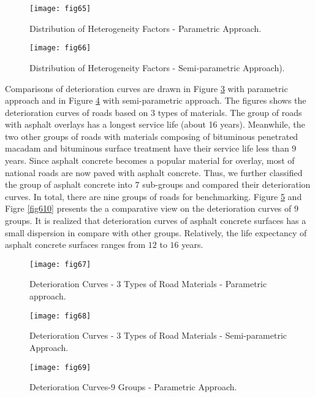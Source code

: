 \begin{figure}[t]
\begin{center}
\texttt{[image: fig65]}
\end{center}
\caption{Distribution of Heterogeneity Factors - Parametric Approach.}
\label{fig65}
\end{figure}

\begin{figure}[t]
\begin{center}
\texttt{[image: fig66]}
\end{center}
\caption{Distribution of Heterogeneity Factors - Semi-parametric Approach).}
\label{fig66}
\end{figure}

Comparisons of deterioration curves are drawn in Figure \ref{fig67} with parametric approach and in Figure \ref{fig68} with semi-parametric approach. The figures shows the deterioration curves of roads based on $3$ types of materials. The group of roads with asphalt overlays has a longest service life (about 16 years). Meanwhile, the two other groups of roads with materials composing of bituminous penetrated macadam and bituminous surface treatment have their service life less than $9$ years. Since asphalt concrete becomes a popular material for overlay, most of national roads are now paved with asphalt concrete. Thus, we further classified the group of asphalt concrete into $7$ sub-groups and compared their deterioration curves. In total, there are nine groups of roads for benchmarking. Figure \ref{fig69} and Figre \ref{fig610} presents the a comparative view on the deterioration curves of $9$ groups. It is realized that deterioration curves of asphalt concrete surfaces has a small dispersion in compare with other groups. Relatively, the life expectancy of asphalt concrete surfaces ranges from $12$ to $16$ years.

\begin{figure}[t]
\begin{center}
\texttt{[image: fig67]}
\end{center}
\caption{Deterioration Curves - 3 Types of Road Materials - Parametric approach.}
\label{fig67}
\end{figure}

\begin{figure}[t]
\begin{center}
\texttt{[image: fig68]}
\end{center}
\caption{Deterioration Curves - 3 Types of Road Materials - Semi-parametric Approach.}
\label{fig68}
\end{figure}
%
%
\begin{figure}[t]
\begin{center}
\texttt{[image: fig69]}
\end{center}
\caption{Deterioration Curves-9 Groups - Parametric Approach.}
\label{fig69}
\end{figure}

